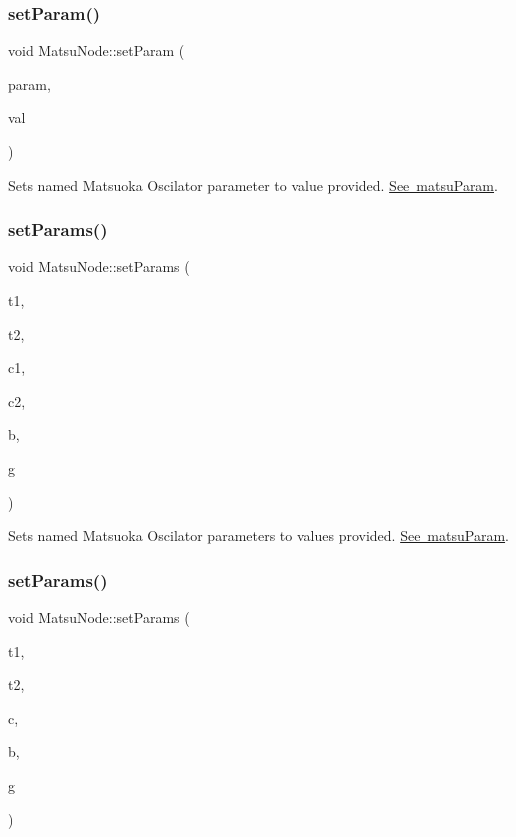 \subsubsection{\texorpdfstring{set\+Param()}{setParam()}}
{\footnotesize\ttfamily void Matsu\+Node\+::set\+Param (\begin{DoxyParamCaption}\item[{\mbox{\hyperlink{classMatsuNode_aed801e1d0363292efc99bb02f1911386}{matsu\+Param}}}]{param,  }\item[{double}]{val }\end{DoxyParamCaption})}



Sets named Matsuoka Oscilator parameter to value provided. \mbox{\hyperlink{classMatsuNode_aed801e1d0363292efc99bb02f1911386}{See matsu\+Param}}. 

\mbox{\label{classMatsuNode_a15b6cfcaa1e20abf04c7c18da3881d60}} 
\subsubsection{\texorpdfstring{set\+Params()}{setParams()}\hspace{0.1cm}{\footnotesize\ttfamily [1/2]}}
{\footnotesize\ttfamily void Matsu\+Node\+::set\+Params (\begin{DoxyParamCaption}\item[{double}]{t1,  }\item[{double}]{t2,  }\item[{double}]{c1,  }\item[{double}]{c2,  }\item[{double}]{b,  }\item[{double}]{g }\end{DoxyParamCaption})}



Sets named Matsuoka Oscilator parameters to values provided. \mbox{\hyperlink{classMatsuNode_aed801e1d0363292efc99bb02f1911386}{See matsu\+Param}}. 

\mbox{\label{classMatsuNode_ab240f6a290cf33356d9df8fce58633ab}} 
\subsubsection{\texorpdfstring{set\+Params()}{setParams()}\hspace{0.1cm}{\footnotesize\ttfamily [2/2]}}
{\footnotesize\ttfamily void Matsu\+Node\+::set\+Params (\begin{DoxyParamCaption}\item[{double}]{t1,  }\item[{double}]{t2,  }\item[{double}]{c,  }\item[{double}]{b,  }\item[{double}]{g }\end{DoxyParamCaption})}

